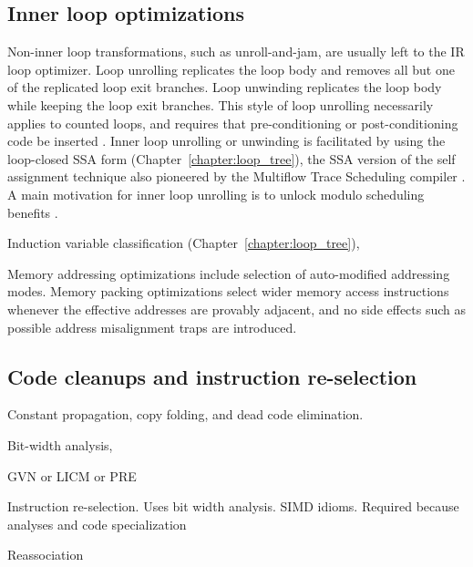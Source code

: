 \subsection{Inner loop optimizations}

Non-inner loop transformations, such as
unroll-and-jam, are usually left to the IR loop optimizer. Loop unrolling
replicates the loop body and removes all but one of the replicated loop exit
branches. Loop unwinding replicates the loop body while keeping the loop exit
branches. This style of loop unrolling necessarily applies to counted loops, and
requires that pre-conditioning or post-conditioning code be inserted
\cite{Lowney:1993:JS}. Inner loop unrolling or unwinding is facilitated by using
the loop-closed SSA form (Chapter~\ref{chapter:loop_tree}), the SSA version of the
self assignment technique also pioneered by the Multiflow Trace Scheduling
compiler \cite{Lowney:1993:JS}. A main motivation for inner loop unrolling is to
unlock modulo scheduling benefits \cite{Lavery:1995:MICRO}.

Induction variable classification (Chapter~\ref{chapter:loop_tree}),




Memory addressing optimizations include selection of auto-modified addressing
modes. Memory packing optimizations select wider memory access instructions
whenever the effective addresses are provably adjacent, and no side effects such
as possible address misalignment traps are introduced.

\subsection{Code cleanups and instruction re-selection}

Constant propagation, copy folding, and dead code elimination.

Bit-width analysis,

GVN or LICM or PRE

Instruction re-selection. Uses bit width analysis. SIMD idioms.
Required because analyses and code specialization

Reassociation


